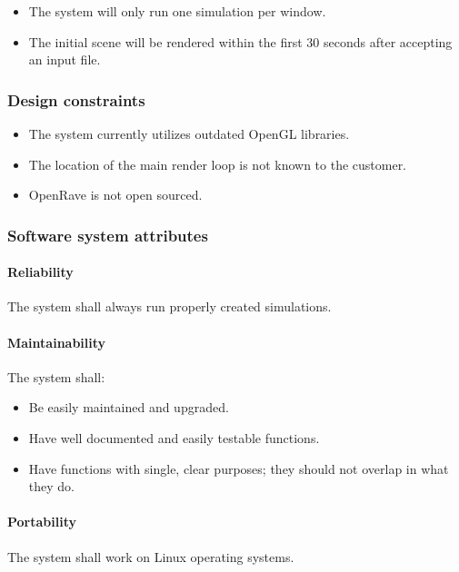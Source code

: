 \begin{flushleft}
\begin{itemize}
\begin{itemize}
\end{itemize}
\item The system will only run one simulation per window.
\item The initial scene will be rendered within the first 30 seconds after accepting an input file.
\end{itemize}

\subsubsection{Design constraints}
\vspace{3mm}
\begin{itemize}
\item The system currently utilizes outdated OpenGL libraries.
\item The location of the main render loop is not known to the customer.
\item OpenRave is not open sourced.
\end{itemize}


\subsubsection{Software system attributes}
\vspace{3mm}
\paragraph{Reliability}
\vspace{5mm}
The system shall always run properly created simulations.


\paragraph{Maintainability}
\vspace{3mm}
The system shall:
\begin{itemize}
\item Be easily maintained and upgraded. 
\item Have well documented and easily testable functions.
\item Have functions with single, clear purposes; they should not overlap in what they do.
\end{itemize}

\paragraph{Portability}
\vspace{3mm}
The system shall work on Linux operating systems.


\end{flushleft}
